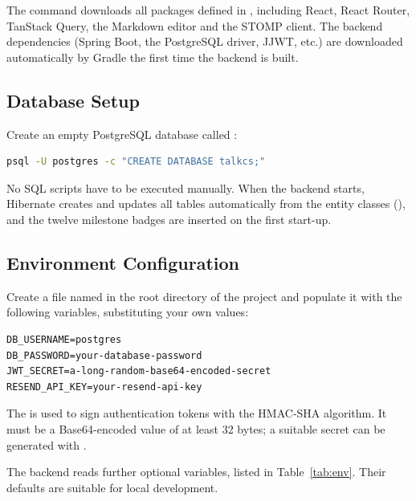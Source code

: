 The  command downloads all packages defined in
, including React, React Router, TanStack Query, the
Markdown editor and the STOMP client. The backend dependencies (Spring Boot, the
PostgreSQL driver, JJWT, etc.) are downloaded automatically by Gradle the first time
the backend is built.

\subsection{Database Setup}

Create an empty PostgreSQL database called :

\begin{lstlisting}[language=bash,caption={Creating the database},label={lst:createdb}]
psql -U postgres -c "CREATE DATABASE talkcs;"
\end{lstlisting}

No SQL scripts have to be executed manually. When the backend starts, Hibernate
creates and updates all tables automatically from the entity classes
(), and the twelve milestone badges are
inserted on the first start-up.

\subsection{Environment Configuration}

Create a file named  in the root directory of the project and populate it
with the following variables, substituting your own values:

\begin{lstlisting}[language=Properties,caption={Content of \texttt{.env}},label={lst:env}]
DB_USERNAME=postgres
DB_PASSWORD=your-database-password
JWT_SECRET=a-long-random-base64-encoded-secret
RESEND_API_KEY=your-resend-api-key
\end{lstlisting}

The  is used to sign authentication tokens with the HMAC-SHA
algorithm. It must be a Base64-encoded value of at least 32 bytes; a suitable secret
can be generated with .

The backend reads further optional variables, listed in Table~\ref{tab:env}. Their
defaults are suitable for local development.

